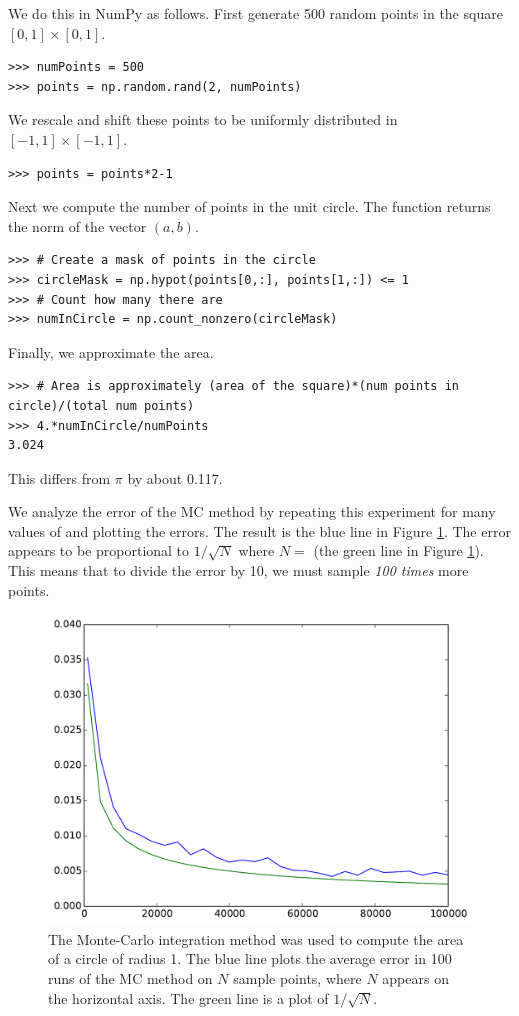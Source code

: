 We do this in NumPy as follows. First generate 500 random points in the square $[0,1] \times [0,1]$.
\begin{lstlisting}
>>> numPoints = 500
>>> points = np.random.rand(2, numPoints)
\end{lstlisting}
We rescale and shift these points to be uniformly distributed in $[-1,1]\times[-1,1]$.
\begin{lstlisting}
>>> points = points*2-1
\end{lstlisting}
Next we compute the number of points in the unit circle.
The function  returns the norm of the vector $(a, b)$.
\begin{lstlisting}
>>> # Create a mask of points in the circle
>>> circleMask = np.hypot(points[0,:], points[1,:]) <= 1
>>> # Count how many there are
>>> numInCircle = np.count_nonzero(circleMask)
\end{lstlisting}
Finally, we approximate the area.
\begin{lstlisting}
>>> # Area is approximately (area of the square)*(num points in circle)/(total num points)
>>> 4.*numInCircle/numPoints
3.024
\end{lstlisting}
This differs from $\pi$ by about 0.117.






We analyze the error of the MC method by repeating this experiment for many values of  and plotting the errors.
The result is the blue line in Figure \ref{fig:mc_error}.
The error appears to be proportional to $1/\sqrt{N}$ where $N=$  (the green line in Figure \ref{fig:mc_error}).
This means that to divide the error by 10, we must sample \emph{100 times} more points.

\begin{figure}
\includegraphics[width=.7\textwidth]{mc_error.pdf}
\caption{The Monte-Carlo integration method was used to compute the area of a circle of radius 1. 
The blue line plots the average error in 100 runs of the MC method on $N$ sample points, where $N$ appears on the horizontal axis.
The green line is a plot of $1/\sqrt{N}$. }
\label{fig:mc_error}
\end{figure}

